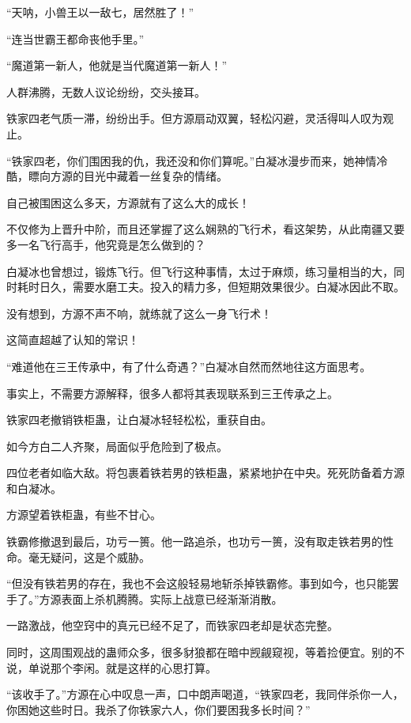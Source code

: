 
\begin{this_body}

“天呐，小兽王以一敌七，居然胜了！”

“连当世霸王都命丧他手里。”

“魔道第一新人，他就是当代魔道第一新人！”

人群沸腾，无数人议论纷纷，交头接耳。

铁家四老气质一滞，纷纷出手。但方源扇动双翼，轻松闪避，灵活得叫人叹为观止。

“铁家四老，你们围困我的仇，我还没和你们算呢。”白凝冰漫步而来，她神情冷酷，瞟向方源的目光中藏着一丝复杂的情绪。

自己被围困这么多天，方源就有了这么大的成长！

不仅修为上晋升中阶，而且还掌握了这么娴熟的飞行术，看这架势，从此南疆又要多一名飞行高手，他究竟是怎么做到的？

白凝冰也曾想过，锻炼飞行。但飞行这种事情，太过于麻烦，练习量相当的大，同时耗时日久，需要水磨工夫。投入的精力多，但短期效果很少。白凝冰因此不取。

没有想到，方源不声不响，就练就了这么一身飞行术！

这简直超越了认知的常识！

“难道他在三王传承中，有了什么奇遇？”白凝冰自然而然地往这方面思考。

事实上，不需要方源解释，很多人都将其表现联系到三王传承之上。

铁家四老撤销铁柜蛊，让白凝冰轻轻松松，重获自由。

如今方白二人齐聚，局面似乎危险到了极点。

四位老者如临大敌。将包裹着铁若男的铁柜蛊，紧紧地护在中央。死死防备着方源和白凝冰。

方源望着铁柜蛊，有些不甘心。

铁霸修撤退到最后，功亏一篑。他一路追杀，也功亏一篑，没有取走铁若男的性命。毫无疑问，这是个威胁。

“但没有铁若男的存在，我也不会这般轻易地斩杀掉铁霸修。事到如今，也只能罢手了。”方源表面上杀机腾腾。实际上战意已经渐渐消散。

一路激战，他空窍中的真元已经不足了，而铁家四老却是状态完整。

同时，这周围观战的蛊师众多，很多豺狼都在暗中觊觎窥视，等着捡便宜。别的不说，单说那个李闲。就是这样的心思打算。

“该收手了。”方源在心中叹息一声，口中朗声喝道，“铁家四老，我同伴杀你一人，你困她这些时日。我杀了你铁家六人，你们要困我多长时间？”


\end{this_body}
